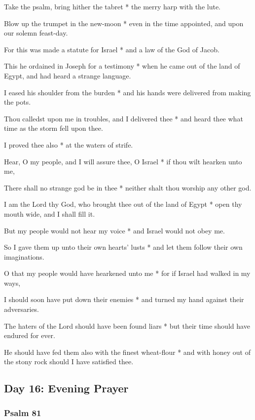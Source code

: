 Take the psalm, bring hither the tabret * the merry harp with the lute.

Blow up the trumpet in the new-moon * even in the time appointed, and upon our solemn feast-day.

For this was made a statute for Israel * and a law of the God of Jacob.

This he ordained in Joseph for a testimony * when he came out of the land of Egypt, and had heard a strange language.

I eased his shoulder from the burden * and his hands were delivered from making the pots.

Thou calledst upon me in troubles, and I delivered thee * and heard thee what time as the storm fell upon thee.

I proved thee also * at the waters of strife.

Hear, O my people, and I will assure thee, O Israel * if thou wilt hearken unto me,

There shall no strange god be in thee * neither shalt thou worship any other god.

I am the Lord thy God, who brought thee out of the land of Egypt * open thy mouth wide, and I shall fill it.

But my people would not hear my voice * and Israel would not obey me.

So I gave them up unto their own hearts' lusts * and let them follow their own imaginations.

O that my people would have hearkened unto me * for if Israel had walked in my ways,

I should soon have put down their enemies * and turned my hand against their adversaries.

The haters of the Lord should have been found liars * but their time should have endured for ever.

He should have fed them also with the finest wheat-flour * and with honey out of the stony rock should I have satisfied thee.

\subsection{Day 16: Evening Prayer}

\subsubsection{Psalm 81}


